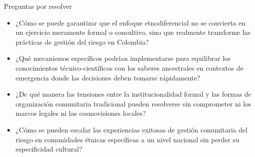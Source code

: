 \documentclass[
  spanish,
  letterpaper,
]{book}
\providecommand{\tightlist}{%
  \setlength{\itemsep}{0pt}\setlength{\parskip}{0pt}}
\begin{document}
\begin{tcolorbox}[enhanced jigsaw, rightrule=.15mm, colframe=quarto-callout-important-color-frame, opacityback=0, arc=.35mm, bottomrule=.15mm, toprule=.15mm, breakable, colback=white, leftrule=.75mm, left=2mm]

Preguntas por resolver

\begin{itemize}
\tightlist
\item
  ¿Cómo se puede garantizar que el enfoque etnodiferencial no se
  convierta en un ejercicio meramente formal o consultivo, sino que
  realmente transforme las prácticas de gestión del riesgo en Colombia?
\item
  ¿Qué mecanismos específicos podrían implementarse para equilibrar los
  conocimientos técnico-científicos con los saberes ancestrales en
  contextos de emergencia donde las decisiones deben tomarse
  rápidamente?
\item
  ¿De qué manera las tensiones entre la institucionalidad formal y las
  formas de organización comunitaria tradicional pueden resolverse sin
  comprometer ni los marcos legales ni las cosmovisiones locales?
\item
  ¿Cómo se pueden escalar las experiencias exitosas de gestión
  comunitaria del riesgo en comunidades étnicas específicas a un nivel
  nacional sin perder su especificidad cultural?
\end{itemize}

\end{tcolorbox}
\end{document}
